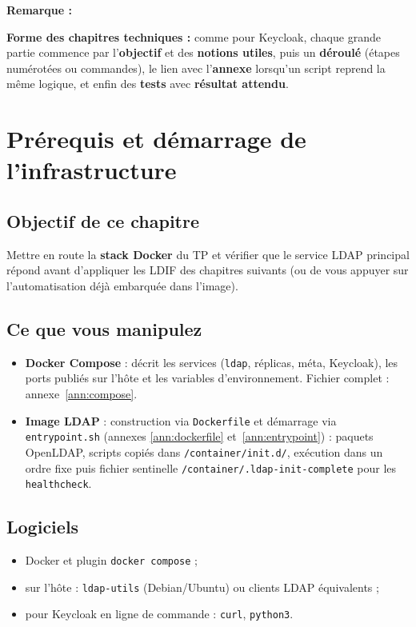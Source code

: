 \documentclass[11pt,a4paper]{report}
\newcommand{\bash}[1]{\lstinline[style=bashstyle, basicstyle=\ttfamily]{#1}}
\newenvironment{nota}{%
  \par\medskip\noindent
  \begin{lrbox}{\notabox}%
  \begin{minipage}{0.97\linewidth}%
  \small
  \textbf{Remarque :}~%
}{%
  \end{minipage}%
  \end{lrbox}%
  {\setlength{\fboxsep}{6pt}%
   \fcolorbox{black!15}{black!3}{\usebox{\notabox}}}%
  \par\medskip
}
\begin{document}
\begin{nota}
\textbf{Forme des chapitres techniques :} comme pour Keycloak, chaque grande partie commence par l'\textbf{objectif} et des \textbf{notions utiles}, puis un \textbf{déroulé} (étapes numérotées ou commandes), le lien avec l'\textbf{annexe} lorsqu'un script reprend la même logique, et enfin des \textbf{tests} avec \textbf{résultat attendu}.
\end{nota}

\chapter{Prérequis et démarrage de l'infrastructure}\label{chap:prereq}

\section{Objectif de ce chapitre}

Mettre en route la \textbf{stack Docker} du TP et vérifier que le service LDAP principal répond avant d'appliquer les LDIF des chapitres suivants (ou de vous appuyer sur l'automatisation déjà embarquée dans l'image).

\section{Ce que vous manipulez}

\begin{itemize}[leftmargin=*]
  \item \textbf{Docker Compose} : décrit les services (\texttt{ldap}, réplicas, méta, Keycloak), les ports publiés sur l'hôte et les variables d'environnement. Fichier complet : annexe~\ref{ann:compose}.
  \item \textbf{Image LDAP} : construction via \texttt{Dockerfile} et démarrage via \texttt{entrypoint.sh} (annexes \ref{ann:dockerfile} et~\ref{ann:entrypoint}) : paquets OpenLDAP, scripts copiés dans \texttt{/container/init.d/}, exécution dans un ordre fixe puis fichier sentinelle \texttt{/container/.ldap-init-complete} pour les \texttt{healthcheck}.
\end{itemize}

\section{Logiciels}

\begin{itemize}[leftmargin=*]
  \item Docker et plugin \bash{docker compose} ;
  \item sur l'hôte : \texttt{ldap-utils} (Debian/Ubuntu) ou clients LDAP équivalents ;
  \item pour Keycloak en ligne de commande : \bash{curl}, \bash{python3}.
\end{itemize}
\end{document}
